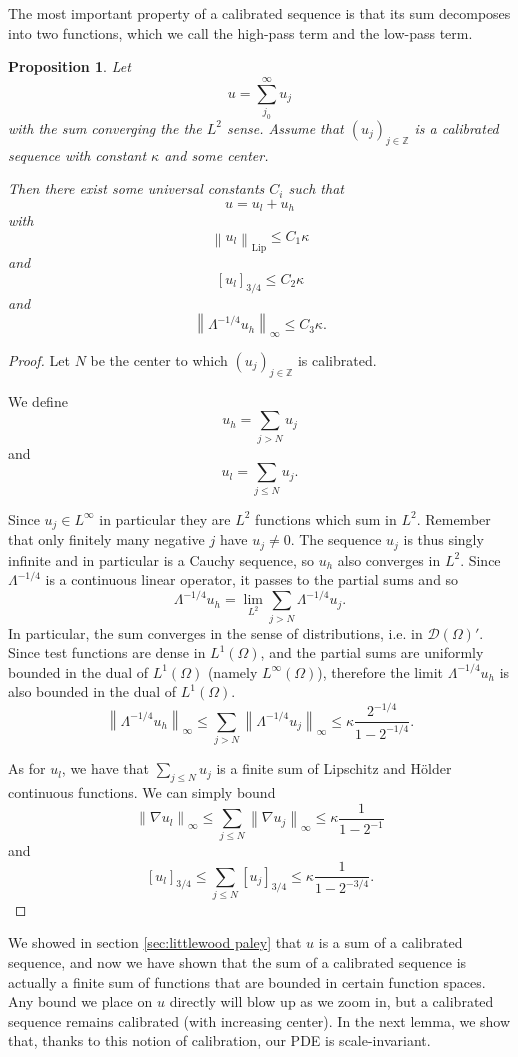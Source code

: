\documentclass[11pt]{amsart}
\newtheorem{proposition}[theorem]{Proposition}
\theoremstyle{remark}
\theoremstyle{definition}
\newcommand{\Z}{\mathbb{Z}}
\newcommand{\norm}[1]{\left\lVert#1\right\rVert}
\newcommand{\bracket}[1]{\left[ #1 \right]}
\newcommand{\grad}{\nabla}
\newcommand{\Lip}{\text{Lip}}
\newcommand{\test}{\mathcal{D}}
\newcommand{\ulow}{u_l}
\newcommand{\uhigh}{u_h}
\begin{document}
The most important property of a calibrated sequence is that its sum decomposes into two functions, which we call the high-pass term and the low-pass term.  

\begin{proposition} \label{thm:calibration is good}
Let 
\[ u = \sum_{j_0}^\infty u_j \]
with the sum converging the the $L^2$ sense.  Assume that $(u_j)_{j \in \Z}$ is a calibrated sequence with constant $\kappa$ and some center.  

Then there exist some universal constants $C_i$ such that
\[ u = \ulow + \uhigh \]
with 
\[ \norm{\ulow}_{\Lip} \leq C_1 \kappa\]
and
\[ \bracket{\ulow}_{3/4} \leq C_2 \kappa \]
and
\[ \norm{\Lambda^{-1/4} \uhigh}_\infty \leq C_3 \kappa. \]
\end{proposition}

\begin{proof}
Let $N$ be the center to which $(u_j)_{j \in \Z}$ is calibrated.  

We define
\[ \uhigh = \sum_{j > N} u_j \]
and 
\[ \ulow = \sum_{j \leq N} u_j. \]

Since $u_j \in L^\infty$ in particular they are $L^2$ functions which sum in $L^2$.  Remember that only finitely many negative $j$ have $u_j \neq 0$.  The sequence $u_j$ is thus singly infinite and in particular is a Cauchy sequence, so $\uhigh$ also converges in $L^2$.  Since $\Lambda^{-1/4}$ is a continuous linear operator, it passes to the partial sums and so
\[ \Lambda^{-1/4} \uhigh = \lim_{L^2} \sum_{j>N} \Lambda^{-1/4} u_j. \]
In particular, the sum converges in the sense of distributions, i.e. in $\test(\Omega)'$.  Since test functions are dense in $L^1(\Omega)$, and the partial sums are uniformly bounded in the dual of $L^1(\Omega)$ (namely $L^\infty(\Omega)$), therefore the limit $\Lambda^{-1/4} \uhigh$ is also bounded in the dual of $L^1(\Omega)$.  
\[ \norm{\Lambda^{-1/4} \uhigh}_\infty \leq \sum_{j>N} \norm{\Lambda^{-1/4} u_j}_\infty \leq \kappa \frac{2^{-1/4}}{1-2^{-1/4}}. \]

As for $\ulow$, we have that $\sum_{j \leq N} u_j$ is a finite sum of Lipschitz and H\"{o}lder continuous functions.  We can simply bound
\[ \norm{\grad \ulow}_\infty \leq \sum_{j \leq N} \norm{\grad u_j}_\infty \leq \kappa \frac{1}{1 - 2^{-1}} \]
and
\[ \bracket{\ulow}_{3/4} \leq \sum_{j \leq N} \bracket{u_j}_{3/4} \leq \kappa \frac{1}{1 - 2^{-3/4}}. \]
\end{proof}

We showed in section \ref{sec:littlewood paley} that $u$ is a sum of a calibrated sequence, and now we have shown that the sum of a calibrated sequence is actually a finite sum of functions that are bounded in certain function spaces.  Any bound we place on $u$ directly will blow up as we zoom in, but a calibrated sequence remains calibrated (with increasing center).  In the next lemma, we show that, thanks to this notion of calibration, our PDE is scale-invariant.  
\end{document}
